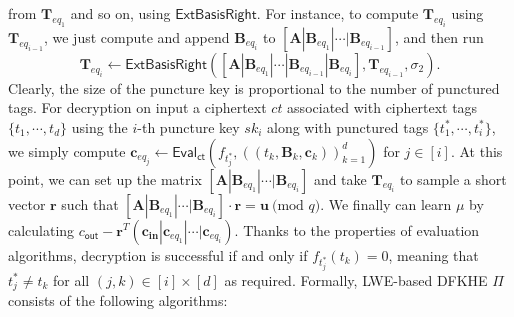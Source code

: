 \documentclass[runningheads,10pt]{llncs}
\begin{document}
{from $\textbf{T}_{eq_{1}}$ and so on, using  $\textsf{ExtBasisRight}$. For instance, to compute $\textbf{T}_{eq_{i}}$ using $\textbf{T}_{eq_{i-1}}$, we just compute and append $\textbf{B}_{eq_{{i}}}$ to $[\textbf{A}|\textbf{B}_{eq_{1}}|\cdots |\textbf{B}_{eq_{{i-1}}}]$, and then run
$$\textbf{T}_{eq_{i}} \leftarrow \textsf{ExtBasisRight}([\textbf{A}|\textbf{B}_{eq_{1}}|\cdots |\textbf{B}_{eq_{{i-1}}}|\textbf{B}_{eq_{{i}}}], \textbf{T}_{eq_{{i-1}}}, \sigma_2).$$
Clearly, the size of the puncture key is proportional to the number of punctured tags. 
For decryption on input a ciphertext $ct$ associated with ciphertext tags $\{t_1, \cdots, t_d\}$ using the $i$-th puncture key $sk_i$ along with punctured tags $\{t^*_1, \cdots, t^*_{i}\}$, we simply  compute $\textbf{c}_{eq_j} \leftarrow \textsf{Eval}_\textsf{ct}(f_{t^*_{j}},  ((t_k, \textbf{B}_k,\textbf{c}_{k}))_{k=1}^d)$ for  $j \in [i]$. At this point, we can set up the matrix $[\textbf{A} |\textbf{B}_{eq_{1}}|\cdots |\textbf{B}_{eq_{{i}}}]$  and take $\textbf{T}_{eq_{{i}}}$ to sample a short vector $\textbf{r} $ such that $[\textbf{A} |\textbf{B}_{eq_{1}}|\cdots |\textbf{B}_{eq_{{i}}}]\cdot \textbf{r}=\textbf{u} ~\text{(mod } q)$.
We finally can learn $\mu $ by  calculating $ c_{\textsf{out}}-\textbf{r}^T(\textbf{c}_\textbf{in}|\textbf{c}_{eq_{1}}|\cdots|\textbf{c}_{eq_i})$. Thanks to the properties of evaluation algorithms, decryption is successful if and only if  $ f_{t^*_{j}}(t_k)=0$, meaning that $t^*_{j}\neq t_k$ for all $(j,k)\in [i]\times [d]$ as required.}
\fi
Formally, LWE-based DFKHE $\Pi$ consists of the following algorithms:
\end{document}
